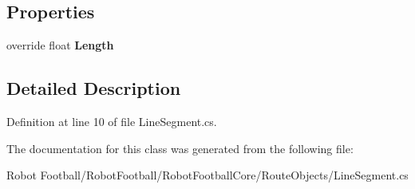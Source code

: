 \subsection*{Properties}
\begin{DoxyCompactItemize}
\item 
\hypertarget{class_robot_football_core_1_1_route_objects_1_1_line_segment_a4d4a425d65747c5da2d0e138d42dff58}{override float {\bfseries Length}}\label{class_robot_football_core_1_1_route_objects_1_1_line_segment_a4d4a425d65747c5da2d0e138d42dff58}

\end{DoxyCompactItemize}


\subsection{Detailed Description}


Definition at line 10 of file Line\-Segment.\-cs.



The documentation for this class was generated from the following file\-:\begin{DoxyCompactItemize}
\item 
Robot Football/\-Robot\-Football/\-Robot\-Football\-Core/\-Route\-Objects/Line\-Segment.\-cs\end{DoxyCompactItemize}
